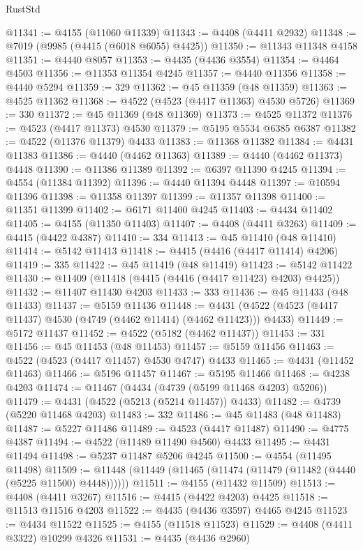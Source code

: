 \begin{lexlean}{RustStd}
\begin{coremodule}
@11341 := @4155 (@11060 @11339)
@11343 := @4408 (@4411 @2932)
@11348 := @7019 (@9985 (@4415 (@6018 @6055) @4425))
@11350 := @11343 @11348 @4158
@11351 := @4440 @8057
@11353 := @4435 (@4436 @3554)
@11354 := @4464 @4503
@11356 := @11353 @11354 @4245
@11357 := @4440 @11356
@11358 := @4440 @5294
@11359 := 329
@11362 := @45 @11359 (@48 @11359)
@11363 := @4525 @11362
@11368 := @4522 (@4523 (@4417 @11363) @4530 @5726)
@11369 := 330
@11372 := @45 @11369 (@48 @11369)
@11373 := @4525 @11372
@11376 := @4523 (@4417 @11373) @4530
@11379 := @5195 @5534 @6385 @6387
@11382 := @4522 (@11376 @11379) @4433
@11383 := @11368 @11382
@11384 := @4431 @11383
@11386 := @4440 (@4462 @11363)
@11389 := @4440 (@4462 @11373) @4448
@11390 := @11386 @11389
@11392 := @6397 @11390 @4245
@11394 := @4554 (@11384 @11392)
@11396 := @4440 @11394 @4448
@11397 := @10594 @11396
@11398 := @11358 @11397
@11399 := @11357 @11398
@11400 := @11351 @11399
@11402 := @6171 @11400 @4245
@11403 := @4434 @11402
@11405 := @4155 (@11350 @11403)
@11407 := @4408 (@4411 @3263)
@11409 := @4415 (@4422 @4387)
@11410 := 334
@11413 := @45 @11410 (@48 @11410)
@11414 := @5142 @11413
@11418 := @4415 (@4416 (@4417 @11414) @4206)
@11419 := 335
@11422 := @45 @11419 (@48 @11419)
@11423 := @5142 @11422
@11430 := @11409 (@11418 (@4415 (@4416 (@4417 @11423) @4203) @4425))
@11432 := @11407 @11430 @4203
@11433 := 333
@11436 := @45 @11433 (@48 @11433)
@11437 := @5159 @11436
@11448 := @4431 (@4522 (@4523 (@4417 @11437) @4530 (@4749 (@4462 @11414) (@4462 @11423))) @4433)
@11449 := @5172 @11437
@11452 := @4522 (@5182 (@4462 @11437))
@11453 := 331
@11456 := @45 @11453 (@48 @11453)
@11457 := @5159 @11456
@11463 := @4522 (@4523 (@4417 @11457) @4530 @4747) @4433
@11465 := @4431 (@11452 @11463)
@11466 := @5196 @11457
@11467 := @5195 @11466
@11468 := @4238 @4203
@11474 := @11467 (@4434 (@4739 (@5199 @11468 @4203) @5206))
@11479 := @4431 (@4522 (@5213 (@5214 @11457)) @4433)
@11482 := @4739 (@5220 @11468 @4203)
@11483 := 332
@11486 := @45 @11483 (@48 @11483)
@11487 := @5227 @11486
@11489 := @4523 (@4417 @11487)
@11490 := @4775 @4387
@11494 := @4522 (@11489 @11490 @4560) @4433
@11495 := @4431 @11494
@11498 := @5237 @11487 @5206 @4245
@11500 := @4554 (@11495 @11498)
@11509 := @11448 (@11449 (@11465 (@11474 (@11479 (@11482 (@4440 (@5225 @11500) @4448))))))
@11511 := @4155 (@11432 @11509)
@11513 := @4408 (@4411 @3267)
@11516 := @4415 (@4422 @4203) @4425
@11518 := @11513 @11516 @4203
@11522 := @4435 (@4436 @3597) @4465 @4245
@11523 := @4434 @11522
@11525 := @4155 (@11518 @11523)
@11529 := @4408 (@4411 @3322) @10299 @4326
@11531 := @4435 (@4436 @2960)

\end{coremodule}
\end{lexlean}
